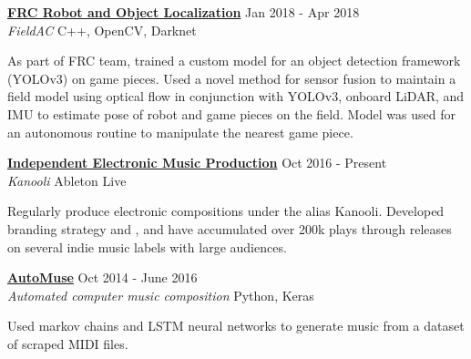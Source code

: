 \documentclass[11pt]{extarticle}
\begin{document}
\noindent
\href{https://github.com/RoboticsTeam4904/FieldAC}{\textbf{FRC Robot and Object Localization}} \hfill Jan 2018 - Apr 2018\\
\textit{FieldAC} \hfill C++, OpenCV, Darknet\\
\vspace{-25pt}
\begin{paragraph}{}
As part of FRC team, trained a custom model for an object detection framework (YOLOv3) on game pieces. Used a novel method for sensor fusion to maintain a field model using optical flow in conjunction with YOLOv3, onboard LiDAR, and IMU to estimate pose of robot and game pieces on the field. Model was used for an autonomous routine to manipulate the nearest game piece.\\
\end{paragraph}

\noindent
\href{https://kanooli.com/}{\textbf{Independent Electronic Music Production}} \hfill Oct 2016 - Present\\
\textit{Kanooli} \hfill Ableton Live\\
\vspace{-25pt}
\begin{paragraph}{}
	Regularly produce electronic compositions under the alias Kanooli. Developed branding strategy and \href{https://kanoo.li/}{\color{blue}{accompanying website}}, and have accumulated over 200k plays through releases on several indie music labels with large audiences.\\
\end{paragraph}


\noindent
\href{https://github.com/nacgarg/AutoMuse}{\textbf{AutoMuse}} \hfill Oct 2014 - June 2016\\
\textit{Automated computer music composition} \hfill Python, Keras \\
\vspace{-25pt}
\begin{paragraph}{}
Used markov chains and LSTM neural networks to generate music from a dataset of scraped MIDI files. \\ 

\end{paragraph}
\end{document}
